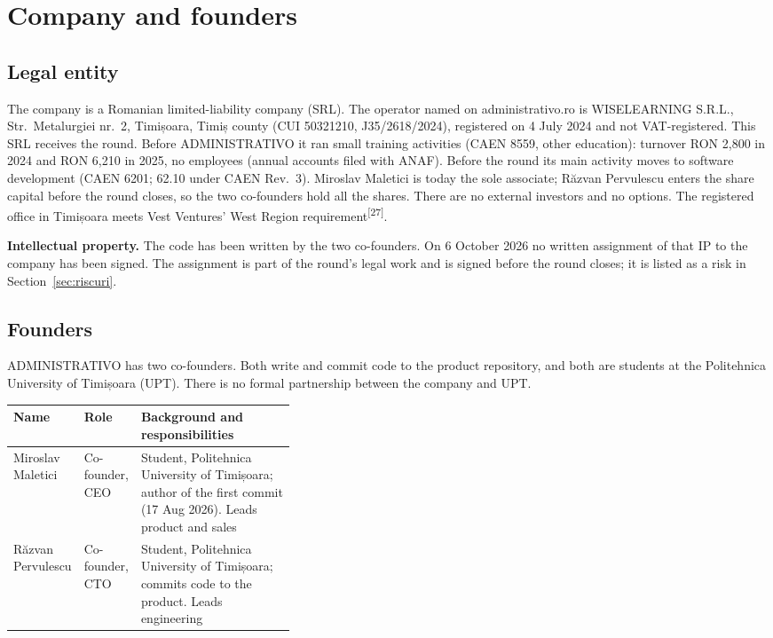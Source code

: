 \documentclass[10pt,a4paper]{article}
\newcommand{\src}[1]{\textsuperscript{\textcolor{brandSlate}{[#1]}}}
\begin{document}
\section{Company and founders}\label{sec:firma}\nobreak

\subsection{Legal entity}

The company is a Romanian limited-liability company (SRL). The operator named on
administrativo.ro is WISELEARNING S.R.L., Str.\ Metalurgiei nr.~2, Timișoara, Timiș county
(CUI 50321210, J35/2618/2024), registered on 4 July 2024 and not VAT-registered. This SRL receives
the round. Before ADMINISTRATIVO it ran small training activities (CAEN 8559, other education):
turnover RON 2,800 in 2024 and RON 6,210 in 2025, no employees (annual accounts filed with ANAF).
Before the round its main activity moves to software development (CAEN 6201; 62.10 under CAEN
Rev.~3). Miroslav Maletici is today the sole associate; Răzvan Pervulescu enters the share capital
before the round closes, so the two co-founders hold all the shares. There are no external
investors and no options. The registered office in Timișoara meets Vest Ventures' West Region
requirement\src{27}.

\textbf{Intellectual property.} The code has been written by the two co-founders. On 6 October
2026 no written assignment of that IP to the company has been signed. The assignment is part of
the round's legal work and is signed before the round closes; it is listed as a risk in
Section~\ref{sec:riscuri}.

\subsection{Founders}

ADMINISTRATIVO has two co-founders. Both write and commit code to the product repository, and
both are students at the Politehnica University of Timișoara (UPT). There is no formal
partnership between the company and UPT.

\begin{table}[H]
\centering\small
\begin{tabularx}{\linewidth}{@{}P{0.24\linewidth}P{0.13\linewidth}L@{}}
\toprule
\textbf{Name} & \textbf{Role} & \textbf{Background and responsibilities} \\
\midrule
Miroslav Maletici & Co-founder, CEO & Student, Politehnica University of Timișoara; author of the first
commit (17 Aug 2026). Leads product and sales \\
Răzvan Pervulescu & Co-founder, CTO & Student, Politehnica University of Timișoara; commits code to the
product. Leads engineering \\
\bottomrule
\end{tabularx}
\end{table}
\end{document}
